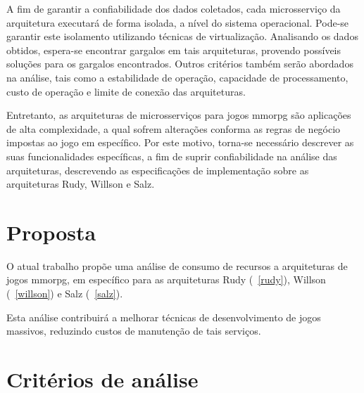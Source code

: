 A fim de garantir a confiabilidade dos dados coletados, cada microsserviço da arquitetura executará de forma isolada, a nível do sistema operacional.
%
Pode-se garantir este isolamento utilizando técnicas de virtualização.
%
Analisando os dados obtidos, espera-se encontrar gargalos em tais arquiteturas, provendo possíveis soluções para os gargalos encontrados.
%
Outros critérios também serão abordados na análise, tais como a estabilidade de operação, capacidade de processamento, custo de operação e limite de conexão das arquiteturas.
%

Entretanto, as arquiteturas de microsserviços para jogos \ac{mmorpg} são aplicações de alta complexidade, a qual sofrem alterações conforma as regras de negócio impostas ao jogo em específico.
%
Por este motivo, torna-se necessário descrever as suas funcionalidades específicas, a fim de suprir confiabilidade na análise das arquiteturas, descrevendo as especificações de implementação sobre as arquiteturas Rudy, Willson e Salz.

\section{Proposta}



O atual trabalho propõe uma análise de consumo de recursos a arquiteturas de jogos \ac{mmorpg}, em específico para as arquiteturas Rudy (~\ref{rudy}), Willson (~\ref{willson}) e Salz (~\ref{salz}).

Esta análise contribuirá a melhorar técnicas de desenvolvimento de jogos massivos, reduzindo custos de manutenção de tais serviços.


\section{Critérios de análise}

